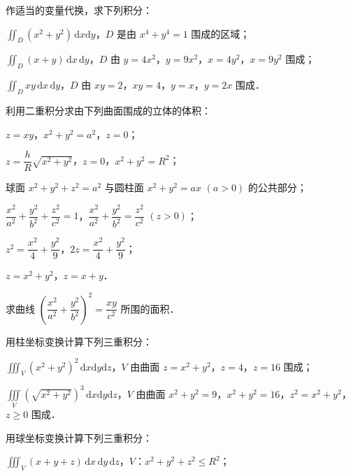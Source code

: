 \begin{xiti}
\begin{ziti}
\end{ziti}
\item 作适当的变量代换，求下列积分：
\begin{ziti}
\item $\displaystyle\iint_{D}(x^{2}+y^{2})\,\mathrm{d}x\mathrm{d}y$，$D$ 是由 $x^{4}+y^{4}=1$ 围成的区域；
\item $\displaystyle\iint_{D}(x+y)\,\mathrm{d}x\,\mathrm{d}y$，$D$ 由 $y=4x^{2}$，$y=9x^{2}$，$x=4y^{2}$，$x=9y^{2}$ 围成；
\item $\displaystyle\iint_{D}xy\,\mathrm{d}x\,\mathrm{d}y$，$D$ 由 $xy=2$，$xy=4$，$y=x$，$y=2x$ 围成．
\end{ziti}
\item 利用二重积分求由下列曲面围成的立体的体积：
\begin{ziti}
\item $z=xy$，$x^{2}+y^{2}=a^{2}$，$z=0$；
\item $z=\dfrac{h}{R}\sqrt{x^{2}+y^{2}}$，$z=0$，$x^{2}+y^{2}=R^{2}$；
\item 球面 $x^{2}+y^{2}+z^{2}=a^{2}$ 与圆柱面 $x^{2}+y^{2}=ax$ $(a>0)$ 的公共部分；
\item $\dfrac{x^{2}}{a^{2}}+\dfrac{y^{2}}{b^{2}}+\dfrac{z^{2}}{c^{2}}=1$，$\dfrac{x^{2}}{a^{2}}+\dfrac{y^{2}}{b^{2}}=\dfrac{z^{2}}{c^{2}}$ $(z>0)$；
\item $z^{2}=\dfrac{x^{2}}{4}+\dfrac{y^{2}}{9}$，$2z=\dfrac{x^{2}}{4}+\dfrac{y^{2}}{9}$；
\item $z=x^{2}+y^{2}$，$z=x+y$．
\end{ziti}
\item 求曲线 $\left(\dfrac{x^{2}}{a^{2}}+\dfrac{y^{2}}{b^{2}}\right)^{2}=\dfrac{xy}{c^{2}}$ 所围的面积．
\item 用柱坐标变换计算下列三重积分：
\begin{ziti}
\item $\displaystyle\iiint_{V}(x^{2}+y^{2})^{2}\,\mathrm{d}x\mathrm{d}y\mathrm{d}z$，$V$ 由曲面 $z=x^{2}+y^{2}$，$z=4$，$z=16$ 围成；
\item $\displaystyle\iiint\limits_{V}\left(\sqrt{x^{2}+y^{2}}\right)^{3}\,\mathrm{d}x\mathrm{d}y\mathrm{d}z$，$V$ 由曲面 $x^{2}+y^{2}=9$，$x^{2}+y^{2}=16$，$z^{2}=x^{2}+y^{2}$，$z\geqslant 0$ 围成．
\end{ziti}
\item 用球坐标变换计算下列三重积分：
\begin{ziti}
\item $\displaystyle\iiint_{V}(x+y+z)\,\mathrm{d}x\,\mathrm{d}y\,\mathrm{d}z$，$V$：$x^{2}+y^{2}+z^{2}\leqslant R^{2}$；

\end{ziti}
\end{xiti}
